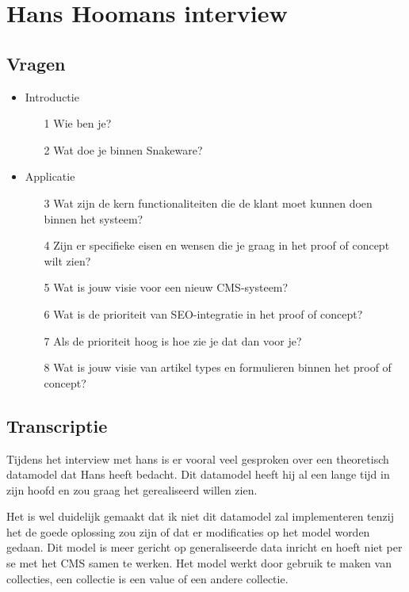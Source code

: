 \section{Hans Hoomans interview}
\label{appendix:ExploreUserRequirementsHans}

\subsection*{Vragen}
\begin{itemize}
    \item{Introductie}
    \begin{itemize}
        \item[1]{Wie ben je?}
        \item[2]{Wat doe je binnen Snakeware?}
    \end{itemize}
    \item{Applicatie}
    \begin{itemize}
        \item[3]{Wat zijn de kern functionaliteiten die de klant moet kunnen doen binnen het systeem?}
        \item[4]{Zijn er specifieke eisen en wensen die je graag in het proof of concept wilt zien?}
        \item[5]{Wat is jouw visie voor een nieuw CMS-systeem?}
        \item[6]{Wat is de prioriteit van SEO-integratie in het proof of concept?}
        \item[7]{Als de prioriteit hoog is hoe zie je dat dan voor je?}
        \item[8]{Wat is jouw visie van artikel types en formulieren binnen het proof of concept?}
    \end{itemize}
\end{itemize}


\subsection*{Transcriptie}

Tijdens het interview met hans is er vooral veel gesproken over een theoretisch datamodel dat Hans heeft bedacht.
Dit datamodel heeft hij al een lange tijd in zijn hoofd en zou graag het gerealiseerd willen zien.

\whitespace
Het is wel duidelijk gemaakt dat ik niet dit datamodel zal implementeren tenzij het de goede oplossing zou zijn of dat er modificaties op het model worden gedaan.
Dit model is meer gericht op generaliseerde data inricht en hoeft niet per se met het CMS samen te werken.
Het model werkt door gebruik te maken van collecties, een collectie is een value of een andere collectie.

